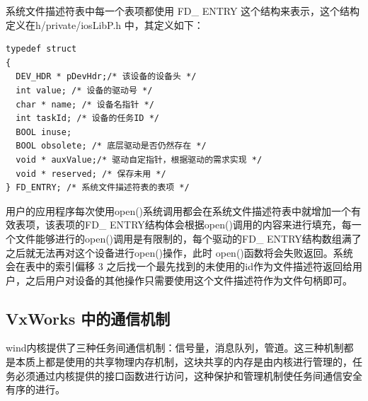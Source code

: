 	
系统文件描述符表中每一个表项都使用 FD\_ ENTRY 这个结构来表示，这个结构定义在h/private/iosLibP.h 中，其定义如下\cite{VxWorks内核解读}：
\lstset{language=C}
\begin{lstlisting}
typedef struct  
{ 
  DEV_HDR * pDevHdr;/* 该设备的设备头 */ 
  int value; /* 设备的驱动号 */ 
  char * name; /* 设备名指针 */ 
  int taskId; /* 设备的任务ID */ 
  BOOL inuse;  
  BOOL obsolete; /* 底层驱动是否仍然存在 */ 
  void * auxValue;/* 驱动自定指针，根据驱动的需求实现 */ 
  void * reserved; /* 保存未用 */ 
} FD_ENTRY; /* 系统文件描述符表的表项 */
\end{lstlisting}


用户的应用程序每次使用open()系统调用都会在系统文件描述符表中就增加一个有效表项，该表项的FD\_ ENTRY结构体会根据open()调用的内容来进行填充，每一个文件能够进行的open()调用是有限制的，每个驱动的FD\_ ENTRY结构数组满了之后就无法再对这个设备进行open()操作，此时 open()函数将会失败返回。系统会在表中的索引偏移 3 之后找一个最先找到的未使用的id作为文件描述符返回给用户，之后用户对设备的其他操作只需要使用这个文件描述符作为文件句柄即可。	
	
\subsection{VxWorks 中的通信机制}
	
	wind内核提供了三种任务间通信机制：信号量，消息队列，管道。这三种机制都是本质上都是使用的共享物理内存机制，这块共享的内存是由内核进行管理的，任务必须通过内核提供的接口函数进行访问，这种保护和管理机制使任务间通信安全有序的进行\cite{胡明民2012基于实时操作系统}。

